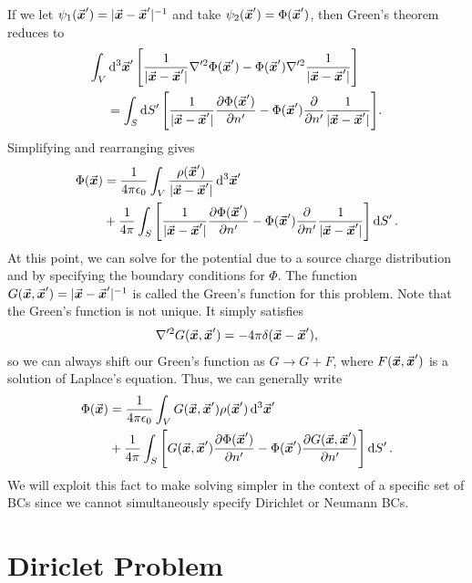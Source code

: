 If we let $\psi_1(\va*{x}') = |\va*{x} - \va*{x}'|^{-1}$ and take $\psi_2(\va*{x}') = \Phi(\va*{x}')$, then Green's theorem reduces to 
\begin{align}
    \int_{V} &\dd[3]{\va*{x}'} \Bigg[ \frac{1}{|\va*{x} - \va*{x}'|} \nabla'^2 \Phi(\va*{x}') - \Phi(\va*{x}') \nabla'^2 \frac{1}{|\va*{x} - \va*{x}'|} \Bigg] \nonumber \\
             &= \int_{S} \dd{S'} \Bigg[ \frac{1}{|\va*{x} - \va*{x}'|} \pdv{\Phi(\va*{x}')}{n'} - \Phi(\va*{x}') \pdv{n'} \frac{1}{|\va*{x} - \va*{x}'|} \Bigg]
.\end{align}
Simplifying and rearranging gives
\begin{align}
    \Phi(\va*{x}) &= \frac{1}{4 \pi \epsilon_0} \int_{V} \frac{\rho(\va*{x}')}{|\va*{x} - \va*{x}'|} \dd[3]{\va*{x}'} \nonumber \\
                  &+ \frac{1}{4 \pi} \int_{S} \Bigg[ \frac{1}{|\va*{x} - \va*{x}'|} \pdv{\Phi(\va*{x}')}{n'} - \Phi(\va*{x}') \pdv{n'} \frac{1}{|\va*{x} - \va*{x}'|} \Bigg] \dd{S'}
.\end{align}
At this point, we can solve for the potential due to a source charge distribution and by specifying the boundary conditions for $\Phi$.
The function $G(\va*{x},\va*{x}') = |\va*{x} - \va*{x}'|^{-1}$ is called the Green's function for this problem.
Note that the Green's function is not unique.
It simply satisfies
\begin{align}
    \nabla'^2 G(\va*{x},\va*{x}') = -4 \pi \delta(\va*{x} - \va*{x}')
,\end{align}
so we can always shift our Green's function as $G \rightarrow G + F$, where $F(\va*{x},\va*{x}')$ is a solution of Laplace's equation.
Thus, we can generally write
\begin{align}
    \label{eq:phi-G}
    \Phi(\va*{x}) &= \frac{1}{4 \pi \epsilon_0} \int_{V} G(\va*{x},\va*{x}') \rho(\va*{x}') \dd[3]{\va*{x}'} \nonumber \\
                  &+ \frac{1}{4 \pi} \int_{S} \Bigg[ G(\va*{x},\va*{x}') \pdv{\Phi(\va*{x}')}{n'} - \Phi(\va*{x}') \pdv{G(\va*{x},\va*{x}')}{n'} \Bigg] \dd{S'}
.\end{align}
We will exploit this fact to make solving  simpler in the context of a specific set of BCs since we cannot simultaneously specify Dirichlet or Neumann BCs.

\section{Diriclet Problem}

